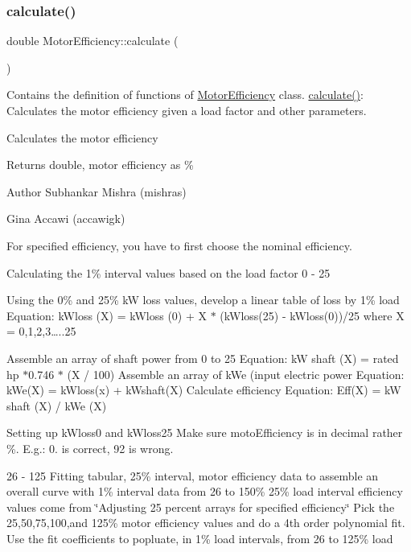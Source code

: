 \subsubsection{\texorpdfstring{calculate()}{calculate()}}
{\footnotesize\ttfamily double Motor\+Efficiency\+::calculate (\begin{DoxyParamCaption}{ }\end{DoxyParamCaption})}



Contains the definition of functions of \hyperlink{class_motor_efficiency}{Motor\+Efficiency} class. \hyperlink{class_motor_efficiency_a448092c19177f5fff0c011f0c9398db0}{calculate()}\+: Calculates the motor efficiency given a load factor and other parameters. 

Calculates the motor efficiency

\begin{DoxyReturn}{Returns}
double, motor efficiency as \%
\end{DoxyReturn}
\begin{DoxyAuthor}{Author}
Subhankar Mishra (mishras) 

Gina Accawi (accawigk) 
\end{DoxyAuthor}
For specified efficiency, you have to first choose the nominal efficiency.

Calculating the 1\% interval values based on the load factor 0 -\/ 25
\begin{DoxyEnumerate}
\item Using the 0\% and 25\% kW loss values, develop a linear table of loss by 1\% load Equation\+: k\+Wloss (X) = k\+Wloss (0) + X $\ast$ (k\+Wloss(25) -\/ k\+Wloss(0))/25 where X = 0,1,2,3…..25
\item Assemble an array of shaft power from 0 to 25 Equation\+: kW shaft (X) = rated hp $\ast$0.746 $\ast$ (X / 100) Assemble an array of k\+We (input electric power Equation\+: k\+We(\+X) = k\+Wloss(x) + k\+Wshaft(\+X) Calculate efficiency Equation\+: Eff(\+X) = kW shaft (X) / k\+We (X)
\end{DoxyEnumerate}

Setting up k\+Wloss0 and k\+Wloss25 Make sure moto\+Efficiency is in decimal rather \%. E.\+g.\+: 0. is correct, 92 is wrong.

26 -\/ 125 Fitting tabular, 25\% interval, motor efficiency data to assemble an overall curve with 1\% interval data from 26 to 150\% 25\% load interval efficiency values come from \char`\"{}\+Adjusting 25 percent arrays for specified efficiency\char`\"{} Pick the 25,50,75,100,and 125\% motor efficiency values and do a 4th order polynomial fit. Use the fit coefficients to popluate, in 1\% load intervals, from 26 to 125\% load

